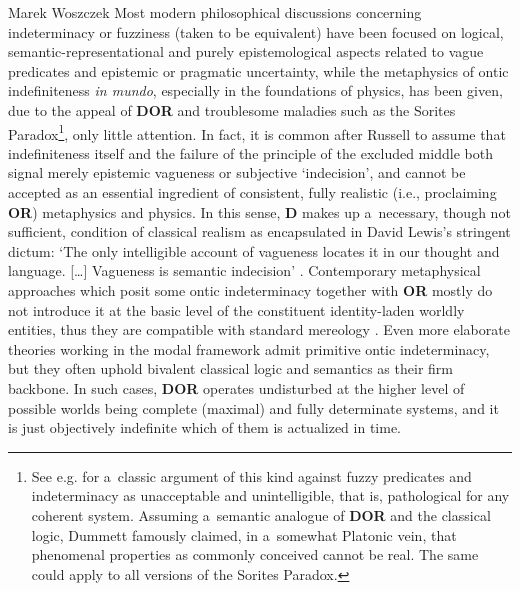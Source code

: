 \begin{artengenv}{Marek Woszczek}
Most modern philosophical discussions concerning indeterminacy or fuzziness (taken to be equivalent) have been focused on logical, semantic-representational and purely epistemological aspects related to vague predicates and epistemic or pragmatic uncertainty, while the metaphysics of ontic indefiniteness \textit{in mundo}, especially in the foundations of physics, has been given, due to the appeal of \textbf{DOR} and troublesome maladies such as the Sorites Paradox\footnote{See e.g.
\parencite[][]{dummett_wangs_1975} %
 for a~classic argument of this kind against fuzzy predicates and indeterminacy as unacceptable and unintelligible, that is, pathological for any coherent system. Assuming a~semantic analogue of \textbf{DOR} and the classical logic, Dummett famously claimed, in a~somewhat Platonic vein, that phenomenal properties as commonly conceived cannot be real. The same could apply to all versions of the Sorites Paradox.}, only little attention. In fact, it is common after Russell to assume that indefiniteness itself and the failure of the principle of the excluded middle both signal merely epistemic vagueness or subjective ‘indecision', and cannot be accepted as an essential ingredient of consistent, fully realistic (i.e., proclaiming \textbf{OR}) metaphysics and physics. In this sense, \textbf{D} makes up a~necessary, though not sufficient, condition of classical realism as encapsulated in David Lewis's stringent dictum: ‘The only intelligible account of vagueness locates it in our thought and language. […] Vagueness is semantic indecision' 
\parencite[][p.212]{lewis_plurality_1986}. %
 Contemporary metaphysical approaches which posit some ontic indeterminacy together with \textbf{OR} mostly do not introduce it at the basic level of the constituent identity-laden worldly entities, thus they are compatible with standard mereology 
\parencite[cf. e.g.][]{morreau_what_2002}. %
 Even more elaborate theories working in the modal framework 
\parencites[e.g.][]{akiba_vagueness_2004}[][]{barnes_theory_2011} %
 admit primitive ontic indeterminacy, but they often uphold bivalent classical logic and semantics as their firm backbone. In such cases, \textbf{DOR} operates undisturbed at the higher level of possible worlds being complete (maximal) and fully determinate systems, and it is just objectively indefinite which of them is actualized in time.


\end{artengenv}
